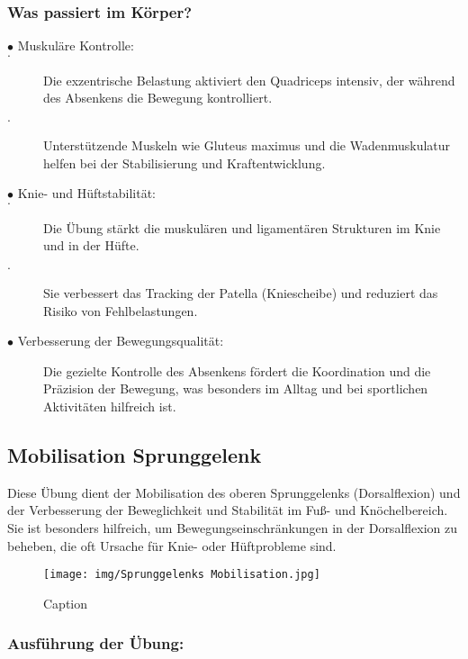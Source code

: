 \subsubsection{Was passiert im Körper?}

\begin{description}
    \item[$\bullet$ Muskuläre Kontrolle:]

    \item[$\cdot$] Die exzentrische Belastung aktiviert den Quadriceps intensiv, der während des Absenkens die Bewegung kontrolliert.
    \item[$\cdot$] Unterstützende Muskeln wie Gluteus maximus und die Wadenmuskulatur helfen bei der Stabilisierung und Kraftentwicklung.

    \item[$\bullet$ Knie- und Hüftstabilität:]
        \item[$\cdot$]Die Übung stärkt die muskulären und ligamentären Strukturen im Knie und in der Hüfte.
        \item[$\cdot$]Sie verbessert das Tracking der Patella (Kniescheibe) und reduziert das Risiko von Fehlbelastungen.
    \item[$\bullet$ Verbesserung der Bewegungsqualität:] Die gezielte Kontrolle des Absenkens fördert die Koordination und die Präzision der Bewegung, was besonders im Alltag und bei sportlichen Aktivitäten hilfreich ist.

\end{description}

\subsection{Mobilisation Sprunggelenk}

Diese Übung dient der Mobilisation des oberen Sprunggelenks (Dorsalflexion) und der Verbesserung der Beweglichkeit und Stabilität im Fuß- und Knöchelbereich. Sie ist besonders hilfreich, um Bewegungseinschränkungen in der Dorsalflexion zu beheben, die oft Ursache für Knie- oder Hüftprobleme sind.

\begin{figure}[h!]
    \centering
    \texttt{[image: img/Sprunggelenks Mobilisation.jpg]}
    \caption{Caption}
    \label{fig:enter-label}
\end{figure}


\subsubsection{Ausführung der Übung:}


